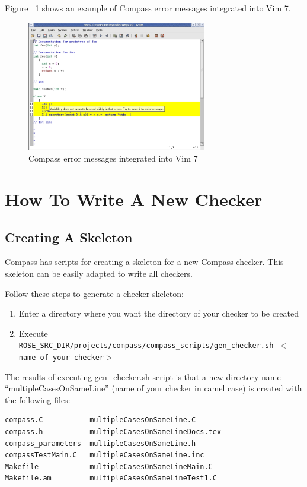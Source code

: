 Figure ~\ref{Compass_VIM7_Screenshot} shows an example of Compass error
messages integrated into Vim 7.
\begin{figure}[!htp]
\centering
\includegraphics[width=0.7\textwidth]{compass_vim7.jpg}
\caption{Compass error messages integrated into Vim 7}
\label{Compass_VIM7_Screenshot}
\end{figure}

\clearpage
\section{How To Write A New Checker}

\subsection{Creating A Skeleton}

Compass has scripts for creating a skeleton for a new Compass
checker. This skeleton can be easily adapted to write all checkers.

Follow these steps to generate a checker skeleton:
\begin{enumerate}
   \item Enter a directory where you want the directory of your checker to be created
   \item Execute {\tt ROSE\_SRC\_DIR/projects/compass/compass\_scripts/gen\_checker.sh $<$name of your checker$>$}
\end{enumerate}

The results of executing gen\_checker.sh script is that a new directory name 
``multipleCasesOnSameLine''
(name of your checker in camel case) is created with the following files:

\begin{verbatim}
compass.C           multipleCasesOnSameLine.C
compass.h           multipleCasesOnSameLineDocs.tex
compass_parameters  multipleCasesOnSameLine.h
compassTestMain.C   multipleCasesOnSameLine.inc
Makefile            multipleCasesOnSameLineMain.C
Makefile.am         multipleCasesOnSameLineTest1.C
\end{verbatim}

